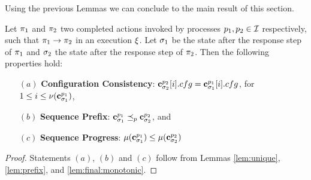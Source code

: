 Using the previous Lemmas we can conclude to the main result of this section.

\begin{theorem}
	Let $\pi_1$ and $\pi_2$ two 
completed  actions invoked by processes $p_1, p_2\in\mathcal{I}$ 
respectively, such that $\pi_1\rightarrow\pi_2$ in an execution $\EX$. 
Let $\sigma_1$ be the state after the response 
step of $\pi_1$ and $\sigma_2$ the state after the response step 
of $\pi_2$.
Then the following properties hold: 
\begin{enumerate}
\item [$(a)$] 
\textbf{Configuration Consistency}: $\mathbf{c}^{p_2}_{\sigma_2}[i].cfg = \mathbf{c}^{p_1}_{\sigma_1}[i].cfg$,  for $ 1 \leq i \leq \nu(\mathbf{c}^{p_1}_{\sigma_1})$,
\item [$(b)$]
 \textbf{Sequence Prefix}: 
 $\mathbf{c}^{p_1}_{\sigma_1}  \preceq_p \mathbf{c}^{p_2}_{\sigma_2}$, and
\item [$(c)$] 
\textbf{Sequence Progress}:
  $\mu(\mathbf{c}^{p_1}_{\sigma_1}) \leq \mu(\mathbf{c}^{p_2}_{\sigma_2})$
\end{enumerate}
\end{theorem}

\begin{proof}
Statements $(a)$, $(b)$ and $(c)$ follow from Lemmas \ref{lem:unique}, \ref{lem:prefix}, and 
\ref{lem:final:monotonic}.
\end{proof}